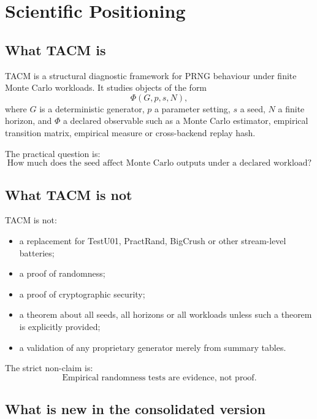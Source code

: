 \documentclass[11pt,a4paper]{article}
\begin{document}
\clearpage
\tableofcontents
\clearpage

\section{Scientific Positioning}

\subsection{What TACM is}

TACM is a structural diagnostic framework for PRNG behaviour under finite Monte Carlo workloads. It studies objects of the form
\[
\Phi(G,p,s,N),
\]
where $G$ is a deterministic generator, $p$ a parameter setting, $s$ a seed, $N$ a finite horizon, and $\Phi$ a declared observable such as a Monte Carlo estimator, empirical transition matrix, empirical measure or cross-backend replay hash.

The practical question is:
\[
\boxed{
\text{How much does the seed affect Monte Carlo outputs under a declared workload?}
}
\]

\subsection{What TACM is not}

TACM is not:
\begin{itemize}
  \item a replacement for TestU01, PractRand, BigCrush or other stream-level batteries;
  \item a proof of randomness;
  \item a proof of cryptographic security;
  \item a theorem about all seeds, all horizons or all workloads unless such a theorem is explicitly provided;
  \item a validation of any proprietary generator merely from summary tables.
\end{itemize}

The strict non-claim is:
\[
\boxed{
\text{Empirical randomness tests are evidence, not proof.}
}
\]

\subsection{What is new in the consolidated version}
\end{document}
